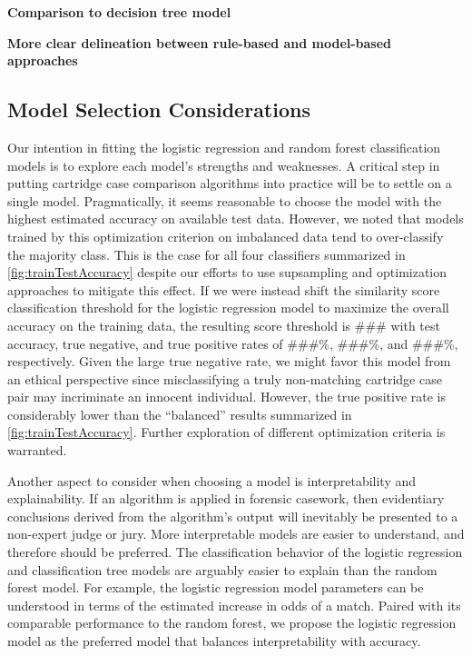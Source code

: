 \documentclass[reprint]{JASA}
\begin{document}
\textbf{Comparison to decision tree model}

\textbf{More clear delineation between rule-based and model-based
approaches}

\hypertarget{model-selection-considerations}{%
\subsection{Model Selection
Considerations}\label{model-selection-considerations}}

Our intention in fitting the logistic regression and random forest
classification models is to explore each model's strengths and
weaknesses. A critical step in putting cartridge case comparison
algorithms into practice will be to settle on a single model.
Pragmatically, it seems reasonable to choose the model with the highest
estimated accuracy on available test data. However, we noted that models
trained by this optimization criterion on imbalanced data tend to
over-classify the majority class. This is the case for all four
classifiers summarized in \autoref{fig:trainTestAccuracy} despite our
efforts to use supsampling and optimization approaches to mitigate this
effect. If we were instead shift the similarity score classification
threshold for the logistic regression model to maximize the overall
accuracy on the training data, the resulting score threshold is \#\#\#
with test accuracy, true negative, and true positive rates of \#\#\#\%,
\#\#\#\%, and \#\#\#\%, respectively. Given the large true negative
rate, we might favor this model from an ethical perspective since
misclassifying a truly non-matching cartridge case pair may incriminate
an innocent individual. However, the true positive rate is considerably
lower than the ``balanced'' results summarized in
\autoref{fig:trainTestAccuracy}. Further exploration of different
optimization criteria is warranted.

Another aspect to consider when choosing a model is interpretability and
explainability. If an algorithm is applied in forensic casework, then
evidentiary conclusions derived from the algorithm's output will
inevitably be presented to a non-expert judge or jury. More
interpretable models are easier to understand, and therefore should be
preferred. The classification behavior of the logistic regression and
classification tree models are arguably easier to explain than the
random forest model. For example, the logistic regression model
parameters can be understood in terms of the estimated increase in odds
of a match. Paired with its comparable performance to the random forest,
we propose the logistic regression model as the preferred model that
balances interpretability with accuracy.
\end{document}
